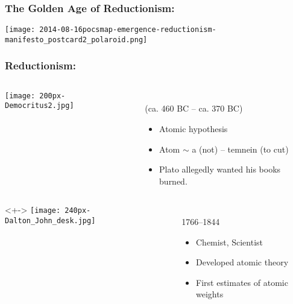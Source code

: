 \begin{frame}
  \frametitle{The Golden Age of Reductionism:}
  \texttt{[image: 2014-08-16pocsmap-emergence-reductionism-manifesto\_postcard2\_polaroid.png]}
\end{frame}


\begin{frame}
  \frametitle{Reductionism:}

  \begin{columns}
    \texttt{[image: 200px-Democritus2.jpg]}\\
    \begin{block}{
        \\
        (ca. 460 BC -- ca. 370 BC)
      }
      \begin{itemize}
      \item 
        Atomic hypothesis
      \item 
        Atom $\sim$ a (not) -- temnein (to cut)
      \item 
        Plato allegedly wanted his books burned.
      \end{itemize}
    \end{block}
  \end{columns}

  \medskip

  \begin{columns}<+->
    \texttt{[image: 240px-Dalton\_John\_desk.jpg]}\\
    \begin{block}{
        \\
        1766--1844
      }
      \begin{itemize}
      \item 
        Chemist, Scientist
      \item 
        Developed atomic theory
      \item 
        First estimates of atomic weights
      \end{itemize}
    \end{block}
  \end{columns}

\end{frame}

